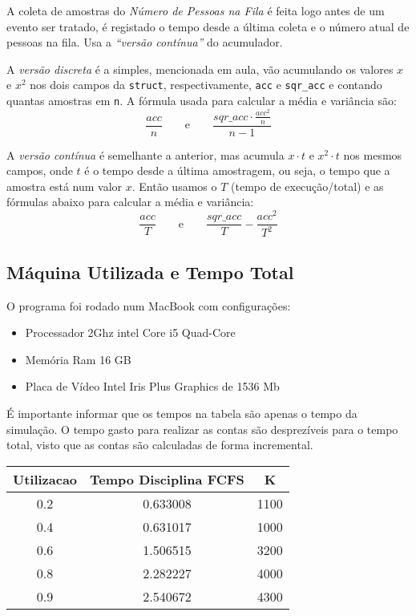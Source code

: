 \documentclass[a4paper]{article}
\newcommand{\inlcode}{\texttt}
\begin{document}
A coleta de amostras do \emph{Número de Pessoas na Fila} é feita
logo antes de um evento ser tratado,
é registado o tempo desde a última coleta e o número atual
de pessoas na fila.
Usa a \emph{``versão contínua''} do acumulador.

A \emph{versão discreta} é a simples, mencionada em aula,
vão acumulando os valores \(x\) e \(x^2\) nos dois campos
da \inlcode{struct}, respectivamente, \inlcode{acc} e
\inlcode{sqr\_acc} e contando quantas amostras em \inlcode{n}.
A fórmula usada para calcular a média e variância são:
\[
    \frac{acc}{n}
    \qquad\text{e}\qquad
    \frac{sqr\_acc \cdot \frac{acc^2}{n}}{n - 1}
\]

A \emph{versão contínua} é semelhante a anterior,
mas acumula \(x \cdot t\) e \(x^2 \cdot t\) nos mesmos campos,
onde \(t\) é
o tempo desde a última amostragem, ou seja,
o tempo que a amostra está num valor \(x\).
Então usamos o \(T\) (tempo de execução/total)
e as fórmulas abaixo para calcular a média e variância:
\[
    \frac{acc}{T}
    \qquad\text{e}\qquad
    \frac{sqr\_acc}{T} - \frac{acc^2}{T^2}
\]

\subsection{Máquina Utilizada e Tempo Total}
O programa foi rodado num MacBook com configurações:
\begin{itemize}
    \item Processador 2Ghz intel Core i5 Quad-Core
    \item Memória Ram 16 GB
    \item Placa de Vídeo Intel Iris Plus Graphics de 1536 Mb 
\end{itemize}


É importante informar que os tempos na tabela são apenas o tempo da simulação. O tempo gasto para realizar as contas são desprezíveis para o tempo total, visto que as contas são calculadas de forma incremental.


\begin{center} \begin{tabular}{|c|c|c|}
    \hline
     Utilizacao & Tempo Disciplina FCFS & K\\
    \hline
    0.2 & 0.633008 & 1100 \\
    \hline
    0.4 & 0.631017 & 1000 \\
    \hline
    0.6 & 1.506515 & 3200 \\
    \hline
    0.8 & 2.282227 & 4000 \\
    \hline
    0.9 & 2.540672 & 4300 \\
    \hline
\end{tabular} \end{center}
\end{document}
